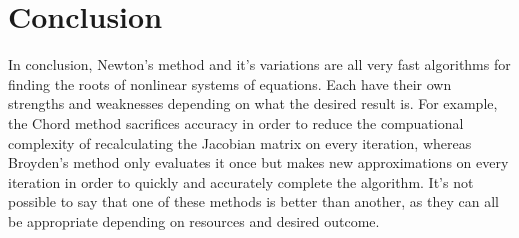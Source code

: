 \documentclass[paper=a4, fontsize=11pt]{scrartcl} %
\numberwithin{equation}{section} %
\numberwithin{figure}{section} %
\numberwithin{table}{section} %
\begin{document}
\section{Conclusion}
In conclusion, Newton's method and it's variations are all very fast algorithms for finding the roots of nonlinear systems of equations.  Each have their own strengths and weaknesses depending on what the desired result is.  For example, the Chord method sacrifices accuracy in order to reduce the compuational complexity of recalculating the Jacobian matrix on every iteration, whereas Broyden's method only evaluates it once but makes new approximations on every iteration in order to quickly and accurately complete the algorithm.  It's not possible to say that one of these methods is better than another, as they can all be appropriate depending on resources and desired outcome.  


\clearpage

 { }
















\end{document}
